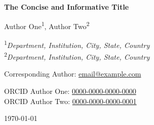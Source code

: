 \documentclass[12pt]{article}
\begin{document}
\begin{titlepage}
    \centering
    \vspace*{1cm}
    
    \Large{\textbf{The Concise and Informative Title}}\\
    \vspace{1.5cm}
    
    \large{Author One}\textsuperscript{1}, Author Two\textsuperscript{2} \\
    \vspace{1cm}
    
    \textsuperscript{1}\textit{Department, Institution, City, State, Country}\\
    \textsuperscript{2}\textit{Department, Institution, City, State, Country}\\
    \vspace{1cm}
    
    Corresponding Author: \href{mailto:email@example.com}{email@example.com}\\
    \vspace{0.5cm}
    
    ORCID Author One: \href{https://orcid.org/0000-0000-0000-0000}{0000-0000-0000-0000}\\
    ORCID Author Two: \href{https://orcid.org/0000-0000-0000-0001}{0000-0000-0000-0001}\\
    \vfill
    
    \large{\today}
\end{titlepage}

\end{document}
